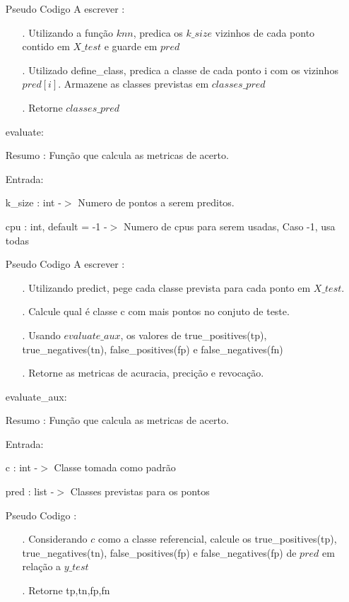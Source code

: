 \documentclass{article}
\begin{document}
\begin{enumerate}
		\quad Pseudo Codigo A escrever :
		
		\begin{enumerate}
	
		\item[.] Utilizando a função $knn$, predica os $k\_size$ vizinhos de cada ponto contido em $X\_test$ e guarde em $pred$
		\item[.] Utilizado define\_class, predica a classe de cada ponto i com os vizinhos $pred[i]$. Armazene as classes previstas em $classes\_pred$
		\item[.] Retorne $classes\_pred$ 
	
		\end{enumerate}

	\item[] evaluate: 
	
		\quad Resumo : Função que calcula as metricas de acerto.

		\quad Entrada: 
	
			\qquad k\_size : int -$>$ Numero de pontos a serem preditos.
	
			\qquad cpu : int, default = -1 -$>$ Numero de cpus para serem usadas, Caso -1, usa todas
	
	
		\quad Pseudo Codigo A escrever :
		
		\begin{enumerate}
	
		\item[.] Utilizando predict, pege cada classe prevista para cada ponto em $X\_test$.
		\item[.] Calcule qual é classe c com mais pontos no conjuto de teste.
		\item[.] Usando $evaluate\_aux$, os valores de true\_positives(tp), true\_negatives(tn), false\_positives(fp) e false\_negatives(fn)
		\item[.] Retorne as metricas de acuracia, precição e revocação.
	
		\end{enumerate}

	\item[] evaluate\_aux: 
	
		\quad Resumo : Função que calcula as metricas de acerto.

		\quad Entrada: 
	
			\qquad c : int -$>$ Classe tomada como padrão

			\qquad pred : list -$>$ Classes previstas para os pontos
	
		\quad Pseudo Codigo :
		
		\begin{enumerate}
	
		\item[.] Considerando $c$ como a classe referencial, calcule os  true\_positives(tp), true\_negatives(tn), false\_positives(fp) e false\_negatives(fp) de $pred$ em relação a $y\_test$
		\item[.] Retorne tp,tn,fp,fn
	
		\end{enumerate}


\end{enumerate}
\end{document}
